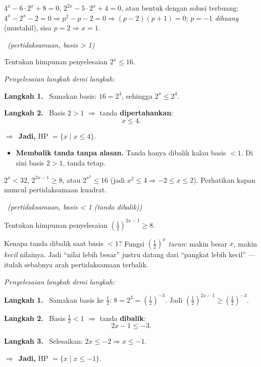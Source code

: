 \documentclass[11pt,a4paper]{report}
\theoremstyle{gaya}
\newcommand{\jawab}{\par\smallskip\noindent\textit{\textcolor{oranye}{Penyelesaian langkah demi langkah:}}\par\smallskip}
\newcommand{\langkah}[1]{\par\smallskip\noindent\textbf{\textcolor{biru}{Langkah #1.}}\ }
\newcommand{\jadi}{\par\smallskip\noindent$\Rightarrow$\ \textbf{Jadi, }}
\newcommand{\soalno}[2]{%
  \par\bigskip
  \noindent{\large\bfseries\color{ungu}\rule[-2pt]{4pt}{14pt}\ Soal #1}%
  \ {\normalfont\itshape\color{gray}(#2)}\par\nopagebreak\smallskip}
\begin{document}
\begin{variasi}
$4^x-6\cdot2^x+8=0$, $2^{2x}-5\cdot2^x+4=0$, atau bentuk dengan solusi
terbuang: $4^x-2^x-2=0\Rightarrow p^2-p-2=0\Rightarrow(p-2)(p+1)=0$; $p=-1$
\emph{dibuang} (mustahil), sisa $p=2\Rightarrow x=1$.
\end{variasi}

\soalno{1.2.5}{pertidaksamaan, basis > 1}
\begin{soalbox}{}
Tentukan himpunan penyelesaian $2^{x} \le 16$.
\end{soalbox}

\jawab
\langkah{1} Samakan basis: $16=2^4$, sehingga $2^x \le 2^4$.
\langkah{2} Basis $2>1$ $\Rightarrow$ tanda \textbf{dipertahankan}:
\[
x \le 4.
\]
\jadi HP $=\{x \mid x\le 4\}$.

\begin{jebakan}
\begin{itemize}[leftmargin=*,topsep=2pt]
  \item \textbf{Membalik tanda tanpa alasan.} Tanda hanya dibalik kalau basis
  $<1$. Di sini basis $2>1$, tanda tetap.
\end{itemize}
\end{jebakan}

\begin{variasi}
$2^x < 32$, $2^{3x-1}\ge 8$, atau $2^{x^2}\le 16$ (jadi $x^2\le4\Rightarrow
-2\le x\le2$). Perhatikan kapan muncul pertidaksamaan kuadrat.
\end{variasi}

\soalno{1.2.6}{pertidaksamaan, basis < 1 (tanda dibalik)}
\begin{soalbox}{}
Tentukan himpunan penyelesaian $\left(\tfrac12\right)^{2x-1} \ge 8$.
\end{soalbox}

\begin{ingat}{Kenapa tanda dibalik saat basis $<1$?}
Fungsi $\left(\tfrac12\right)^x$ \emph{turun}: makin besar $x$, makin
\emph{kecil} nilainya. Jadi ``nilai lebih besar'' justru datang dari ``pangkat
lebih kecil'' --- itulah sebabnya arah pertidaksamaan terbalik.
\end{ingat}

\jawab
\langkah{1} Samakan basis ke $\tfrac12$: $8 = 2^3 = \left(\tfrac12\right)^{-3}$.
Jadi $\left(\tfrac12\right)^{2x-1} \ge \left(\tfrac12\right)^{-3}$.
\langkah{2} Basis $\tfrac12<1$ $\Rightarrow$ tanda \textbf{dibalik}:
\[
2x-1 \le -3.
\]
\langkah{3} Selesaikan: $2x \le -2 \Rightarrow x \le -1$.
\jadi HP $=\{x\mid x\le -1\}$.
\end{document}
